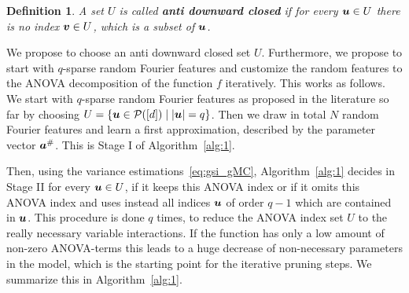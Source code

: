 \documentclass{article}
\renewcommand{\vec}[1]{\ensuremath \mathbf{\boldsymbol{#1}}}
\theoremstyle{definition}
\newtheorem{definition}[theorem]{Definition}
\newenvironment{Definition}{ \begin{definition}\normalfont\slshape}{\end{definition}}
\numberwithin{equation}{section}
\begin{document}
\begin{Definition}\label{def:anti-dc}
A set $U$ is called \textbf{anti downward closed} if for every $\vec u\in U$ there is no index $\vec v\in U$, which is a subset of $\vec u$. 
\end{Definition}
We propose to choose an anti downward closed set $U$. Furthermore, we propose to start with $q$-sparse random Fourier features and customize the random features to the ANOVA decomposition of the function $f$ iteratively. This works as follows. We start with $q$-sparse random Fourier features as proposed in the literature so far by choosing $ U = \{\vec u\in \mathcal P([d])\mid |\vec u| = q\} $. Then we draw in total $N$ random Fourier features and learn a first approximation, described by the parameter vector $\vec a^\#$. 
This is Stage I of Algorithm~\ref{alg:1}. \par
Then, using the variance estimations~\eqref{eq:gsi_gMC}, Algorithm~\ref{alg:1} decides in Stage II for every $\vec u\in U$, if it keeps this ANOVA index or if it omits this ANOVA index and uses instead all indices $\vec u$ of order $q-1$ which are contained in $\vec u$. This procedure is done $q$ times, to reduce the ANOVA index set $U$ to the really necessary variable interactions. If the function has only a low amount of non-zero ANOVA-terms this leads to a huge decrease of non-necessary parameters in the model, which is the starting point for the iterative pruning steps. We summarize this in Algorithm~\ref{alg:1}. \par
\end{document}
